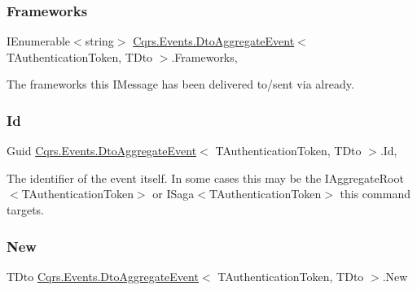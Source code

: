 \subsubsection{\texorpdfstring{Frameworks}{Frameworks}}
{\footnotesize\ttfamily I\+Enumerable$<$string$>$ \hyperlink{classCqrs_1_1Events_1_1DtoAggregateEvent}{Cqrs.\+Events.\+Dto\+Aggregate\+Event}$<$ T\+Authentication\+Token, T\+Dto $>$.Frameworks\hspace{0.3cm}{\ttfamily [get]}, {\ttfamily [set]}}



The frameworks this I\+Message has been delivered to/sent via already. 

\mbox{\label{classCqrs_1_1Events_1_1DtoAggregateEvent_ad5f763ecd79dc9b4882ed15239242d17_ad5f763ecd79dc9b4882ed15239242d17}} 
\subsubsection{\texorpdfstring{Id}{Id}}
{\footnotesize\ttfamily Guid \hyperlink{classCqrs_1_1Events_1_1DtoAggregateEvent}{Cqrs.\+Events.\+Dto\+Aggregate\+Event}$<$ T\+Authentication\+Token, T\+Dto $>$.Id\hspace{0.3cm}{\ttfamily [get]}, {\ttfamily [set]}}



The identifier of the event itself. In some cases this may be the I\+Aggregate\+Root$<$\+T\+Authentication\+Token$>$ or I\+Saga$<$\+T\+Authentication\+Token$>$ this command targets. 

\mbox{\label{classCqrs_1_1Events_1_1DtoAggregateEvent_a702bd5605d7ce538b992c2d43198194c_a702bd5605d7ce538b992c2d43198194c}} 
\subsubsection{\texorpdfstring{New}{New}}
{\footnotesize\ttfamily T\+Dto \hyperlink{classCqrs_1_1Events_1_1DtoAggregateEvent}{Cqrs.\+Events.\+Dto\+Aggregate\+Event}$<$ T\+Authentication\+Token, T\+Dto $>$.New\hspace{0.3cm}{\ttfamily [get]}}



